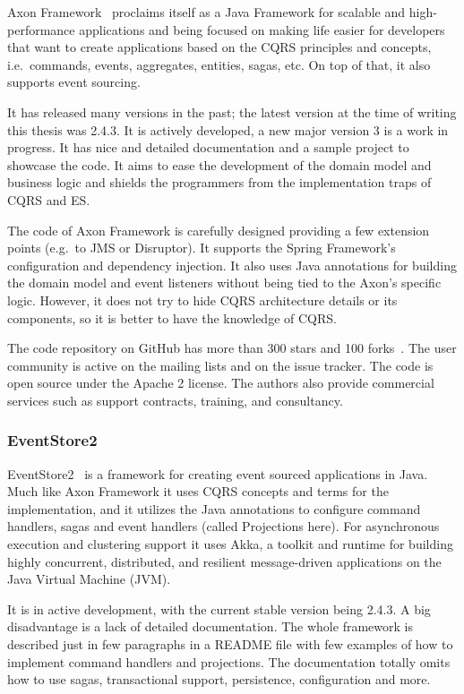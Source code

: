 \documentclass{book}
\begin{document}
Axon Framework~\cite{axon} proclaims itself as a Java Framework for
scalable and high-performance applications and being focused on making
life easier for developers that want to create applications based on the
CQRS principles and concepts, i.e.~commands, events, aggregates,
entities, sagas, etc. On top of that, it also supports event sourcing.

It has released many versions in the past; the latest version at the
time of writing this thesis was 2.4.3. It is actively developed, a new
major version 3 is a work in progress. It has nice and detailed
documentation and a sample project to showcase the code. It aims to ease
the development of the domain model and business logic and shields the
programmers from the implementation traps of CQRS and ES.

The code of Axon Framework is carefully designed providing a few
extension points (e.g.~to JMS or Disruptor). It supports the Spring
Framework's configuration and dependency injection. It also uses Java
annotations for building the domain model and event listeners without
being tied to the Axon's specific logic. However, it does not try to
hide CQRS architecture details or its components, so it is better to
have the knowledge of CQRS.

The code repository on GitHub has more than 300 stars and 100 forks~\cite{axon-repo}. The user community is active on the mailing lists and
on the issue tracker. The code is open source under the Apache 2
license. The authors also provide commercial services such as support
contracts, training, and consultancy.

\subsubsection{EventStore2}\label{eventstore2}

EventStore2~\cite{eventstore2} is a framework for creating event sourced
applications in Java. Much like Axon Framework it uses CQRS concepts and
terms for the implementation, and it utilizes the Java annotations to
configure command handlers, sagas and event handlers (called Projections
here). For asynchronous execution and clustering support it uses Akka, a
toolkit and runtime for building highly concurrent, distributed, and
resilient message-driven applications on the Java Virtual Machine (JVM).

It is in active development, with the current stable version being
2.4.3. A big disadvantage is a lack of detailed documentation. The whole
framework is described just in few paragraphs in a README file with few
examples of how to implement command handlers and projections. The
documentation totally omits how to use sagas, transactional support,
persistence, configuration and more.
\end{document}

